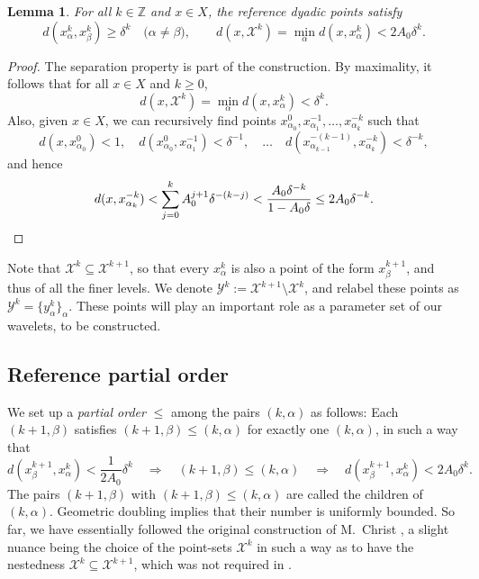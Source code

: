 \documentclass{amsart}
\numberwithin{equation}{section}
\theoremstyle{plain}
\newtheorem{lemma}[equation]{Lemma}
\theoremstyle{definition}
\theoremstyle{remark}
\begin{document}
{{\begin{lemma}
For all $k\in{\mathbb{Z}}$ and $x\in X$, the reference dyadic points satisfy
\begin{equation*}
  d(x^k_{\alpha},x^k_{\beta})\geq\delta^k\quad\big(\alpha\neq\beta\big),\qquad d(x,\mathscr{X}^k)=\min_{\alpha}d(x,x^k_{\alpha})<2A_0\delta^k.
\end{equation*}
\end{lemma}

\begin{proof}
The separation property is part of the construction.
By maximality, it follows that for all $x\in X$ and $k\geq 0$,
\begin{equation*}
  d(x,\mathscr{X}^k)=\min_{\alpha}d(x,x^k_{\alpha})<\delta^k.
\end{equation*}
Also, given $x\in X$, we can recursively find points $x^0_{\alpha_0},x^{-1}_{\alpha_1},\ldots,x^{-k}_{\alpha_k}$ such that
\begin{equation*}
  d(x,x^0_{\alpha_0})<1,\quad d(x^0_{\alpha_0},x^{-1}_{\alpha_1})<\delta^{-1},\quad\ldots\quad d(x^{-(k-1)}_{\alpha_{k-1}},x^{-k}_{\alpha_k})<\delta^{-k},
\end{equation*}
and hence
\begin{equation*}
  d(x,x^{-k}_{\alpha_k})<\sum_{j=0}^k A_0^{j+1}\delta^{-(k-j)}<\frac{A_0\delta^{-k}}{1-A_0\delta}\leq 2A_0\delta^{-k}.\qedhere
\end{equation*}
\end{proof}

Note that $\mathscr{X}^k\subseteq\mathscr{X}^{k+1}$, so that every $x^k_{\alpha}$ is also a point of the form $x^{k+1}_{\beta}$, and thus of all the finer levels.
We denote $\mathscr{Y}^k:=\mathscr{X}^{k+1}\setminus\mathscr{X}^k$, and relabel these points as $\mathscr{Y}^k=\{y^k_\alpha\}_{\alpha}$. These points will play an important role as a parameter set of our wavelets, to be constructed.

\subsection*{Reference partial order}
We set up a \emph{partial order} $\leq$ among the pairs $(k,\alpha)$ as follows: Each $(k+1,\beta)$ satisfies $(k+1,\beta)\leq(k,\alpha)$ for exactly one $(k,\alpha)$, in such a way that
\begin{equation}\label{eq:leqProperties}
 d(x^{k+1}_{\beta},x^k_{\alpha})<\frac{1}{2A_0}\delta^k\quad\Longrightarrow\quad(k+1,\beta)\leq(k,\alpha)
 \quad\Longrightarrow\quad d(x^{k+1}_{\beta},x^k_{\alpha})<2A_0\delta^k.
\end{equation}
The pairs $(k+1,\beta)$ with $(k+1,\beta)\leq(k,\alpha)$ are called the children of $(k,\alpha)$. Geometric doubling implies that their number is uniformly bounded. So far, we have essentially followed the original construction of M.~Christ \cite{Christ}, a slight nuance being the choice of the point-sets $\mathscr{X}^k$ in such a way as to have the nestedness $\mathscr{X}^k\subseteq\mathscr{X}^{k+1}$, which was not required in \cite{Christ,HK,HM}.

}}
\end{document}
